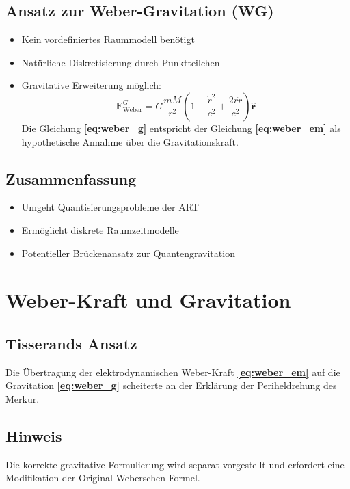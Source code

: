 \subsection{Ansatz zur Weber-Gravitation (WG)}
\begin{itemize}[leftmargin=*,noitemsep]
    \item Kein vordefiniertes Raummodell benötigt
    \item Natürliche Diskretisierung durch Punktteilchen
    \item Gravitative Erweiterung möglich:
    \begin{equation}\label{eq:weber_g}
    \bm{F}_{\text{Weber}}^{G} = G\frac{mM}{r^2}\left(1 - \frac{\dot{r}^2}{c^2} + \frac{2r\ddot{r}}{c^2}\right)\bm{\hat{r}}
    \end{equation}
    Die Gleichung \textbf{\ref{eq:weber_g}} entspricht der Gleichung \textbf{\ref{eq:weber_em}} als hypothetische Annahme über die Gravitationskraft.
\end{itemize}

\subsection*{Zusammenfassung}
\begin{itemize}[leftmargin=*,noitemsep]
    \item Umgeht Quantisierungsprobleme der ART
    \item Ermöglicht diskrete Raumzeitmodelle
    \item Potentieller Brückenansatz zur Quantengravitation
\end{itemize}

\section{Weber-Kraft und Gravitation}

\subsection*{Tisserands Ansatz}
Die Übertragung der elektrodynamischen Weber-Kraft \textbf{\ref{eq:weber_em}} auf die Gravitation \textbf{\ref{eq:weber_g}} scheiterte
an der Erklärung der Periheldrehung des Merkur.

\subsection*{Hinweis}
Die korrekte gravitative Formulierung wird separat vorgestellt und erfordert eine Modifikation der Original-Weberschen Formel.
